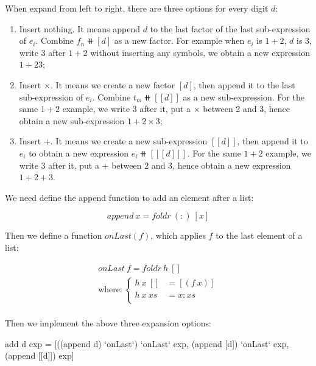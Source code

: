 \documentclass[b5paper]{article}
\begin{document}
\begin{Answer}[ref = {ex:make-centry}]
{When expand from left to right, there are three options for every digit $d$:

\begin{enumerate}
\item Insert nothing. It means append $d$ to the last factor of the last sub-expression of $e_i$. Combine $f_n \doubleplus [d]$ as a new factor. For example when $e_i$ is $1 + 2$, $d$ is 3, write 3 after $1 + 2$ without inserting any symbols, we obtain a new expression $1 + 23$;

\item Insert $\times$. It means we create a new factor $[d]$, then append it to the last sub-expression of $e_i$. Combine $t_m \doubleplus [[d]]$ as a new sub-expression. For the same $1 + 2$ example, we write 3 after it, put a $\times$ between 2 and 3, hence obtain a new sub-expression $1 + 2 \times 3$;

\item Insert +. It means we create a new sub-expression $[[d]]$, then append it to $e_i$ to obtain a new expression $e_i \doubleplus [[[d]]]$. For the same $1 + 2$ example, we write 3 after it, put a + between 2 and 3, hence obtain a new expression $1 + 2 + 3$.
\end{enumerate}

We need define the append function to add an element after a list:

\[
append\ x = foldr\ (:)\ [x]
\]

Then we define a function $onLast(f)$, which applies $f$ to the last element of a list:

\[\begin{array}{l}
onLast\ f = foldr\ h\ [] \\
\text{where}: \begin{cases}
  h\ x\ [] & = [(f\ x)] \\
  h\ x\ xs & = x : xs \\
\end{cases} \\
\end{array}\]

Then we implement the above three expansion options:

\begin{Haskell}
add d exp = [((append d) `onLast`) `onLast` exp,
             (append [d]) `onLast` exp,
             (append [[d]]) exp]
\end{Haskell}
}
\end{Answer}
\end{document}
